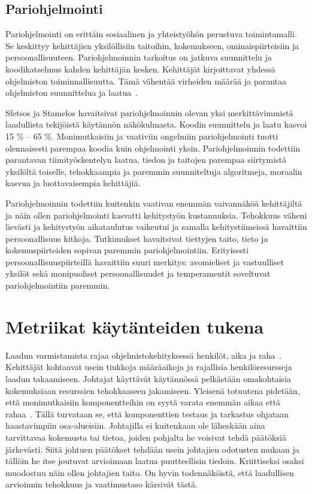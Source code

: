 \documentclass[finnish]{../tktltiki2}
\theoremstyle{definition}
\theoremstyle{remark}
\begin{document}
\subsection{Pariohjelmointi}

Pariohjelmointi on erittäin sosiaalinen ja yhteistyöhön perustuva toimintamalli. Se keskittyy kehittäjien yksilöllisiin 
taitoihin, kokemukseen, ominaispiirteisiin ja persoonallisuuteen. Pariohjelmoinnin tarkoitus on jatkuva suunnittelu ja 
koodikatselmus kahden kehittäjän kesken. Kehittäjät kirjoittavat yhdessä ohjelmiston toiminnallisuutta. Tämä vähentää 
virheiden määrää ja parantaa ohjelmiston suunnittelua ja laatua~\cite{SS10}.

    Sfetsos ja Stamelos havaitsivat pariohjelmoinnin olevan yksi merkittävim\-mistä laadullista tekijöistä käytännön 
näkökulmasta. Koodin suunnittelu ja laatu kasvoi 15 \% -- 65 \%. Monimutkaisiin ja vaativiin ongelmiin pariohjelmointi 
tuotti olennaisesti parempaa koodia kuin ohjelmointi yksin. Pariohjelmoinnin todettiin parantavan tiimityöskentelyn 
laatua, tiedon ja taitojen parempaa siirtymistä yksilöltä toiselle, tehokkaampia ja paremmin suunniteltuja algoritmeja, 
moraalin kasvua ja luottavaisempia kehittäjiä.

    Pariohjelmoinnin todettiin kuitenkin vaativan enemmän vaivannäköä kehittäjiltä ja näin ollen pariohjelmointi 
kasvatti kehitystyön kustannuksia. Tehokkuus väheni lievästi ja kehitystyön aikataulutus vaikeutui ja samalla 
kehitystiimeissä havaittiin persoonallisuus kitkoja. Tutkimukset havaitsivat tiettyjen taito, tieto ja kokemuspiirteiden 
sopivan paremmin pariohjelmointiin. Erityisesti persoonallisuuspiirteillä havaittiin suuri merkitys: avomieliset ja 
vastuulliset yksilöt sekä monipuoliset persoonallisuudet ja temperamentit soveltuvat pariohjelmointiin paremmin.

\section{Metriikat käytänteiden tukena}

Laadun varmistamista rajaa ohjelmistokehityksessä henkilöt, aika ja raha~\cite{ZN08}. Kehittäjät kohtaavat usein 
tiukkoja määräaikoja ja rajallisia henkilöresursseja laadun takaamiseen. Johtajat käyttävät käytännössä pelkästään 
omakohtaisia kokemuksiaan resurssien tehokkaaseen jakamiseen. Yleisenä totuutena pidetään, että monimutkaisiin 
komponentteihin on syytä varata enemmän aikaa että rahaa~\cite{ZN08}. Tällä turvataan se, että komponenttien testaus ja 
tarkastus ohjataan haastavimpiin osa-alueisiin. Johtajilla ei kuitenkaan ole läheskään aina tarvittavaa kokemusta tai 
tietoa, joiden pohjalta he voisivat tehdä päätöksiä järkevästi. Siitä johtuen päätökset tehdään usein johtajien 
odotusten mukaan ja tällöin he itse joutuvat arvioimaan laatua puutteellisin tiedoin. Kriittiseksi osaksi muodostuu näin 
ollen johtajien taito. On hyvin todennäköistä, että laadullisen arvioinnin tehokkuus ja vaatimustaso kärsivät tästä.
\end{document}
